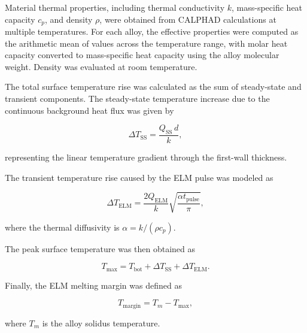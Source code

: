 Material thermal properties, including thermal conductivity \(k\), mass-specific
heat capacity \(c_p\), and density \(\rho\), were obtained from CALPHAD
calculations at multiple temperatures. For each alloy, the effective properties
were computed as the arithmetic mean of values across the temperature range, with
molar heat capacity converted to mass-specific heat capacity using the alloy
molecular weight. Density was evaluated at room temperature.

The total surface temperature rise was calculated as the sum of steady-state and
transient components. The steady-state temperature increase due to the continuous
background heat flux was given by

\vspace{0.2em}
\begin{equation}
\Delta T_{\mathrm{SS}}
=
\frac{Q_{\mathrm{SS}}\, d}{k},
\label{eq:ss_temp_rise}
\end{equation}
\vspace{0.2em}

representing the linear temperature gradient through the first-wall thickness.

The transient temperature rise caused by the ELM pulse was modeled as

\vspace{0.2em}
\begin{equation}
\Delta T_{\mathrm{ELM}}
=
\frac{2Q_{\mathrm{ELM}}}{k}
\sqrt{\frac{\alpha t_{\mathrm{pulse}}}{\pi}},
\label{eq:elm_temp_rise}
\end{equation}
\vspace{0.2em}

where the thermal diffusivity is \(\alpha=k/(\rho c_p)\).

The peak surface temperature was then obtained as

\vspace{0.2em}
\begin{equation}
T_{\max}
=
T_{\mathrm{bot}}
+
\Delta T_{\mathrm{SS}}
+
\Delta T_{\mathrm{ELM}}.
\label{eq:peak_temp}
\end{equation}
\vspace{0.2em}

Finally, the ELM melting margin was defined as

\vspace{0.2em}
\begin{equation}
T_{\mathrm{margin}}
=
T_m
-
T_{\max},
\label{eq:melting_margin}
\end{equation}
\vspace{0.2em}

\noindent where \(T_m\) is the alloy solidus temperature.